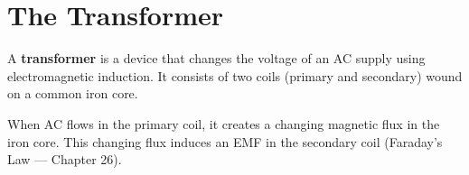 \section{The Transformer}

\begin{definitionbox}[Transformer]
A \textbf{transformer} is a device that changes
the voltage of an AC supply using electromagnetic
induction. It consists of two coils (primary and
secondary) wound on a common iron core.

When AC flows in the primary coil, it creates a
changing magnetic flux in the iron core. This
changing flux induces an EMF in the secondary coil
(Faraday's Law --- Chapter 26).
\end{definitionbox}


